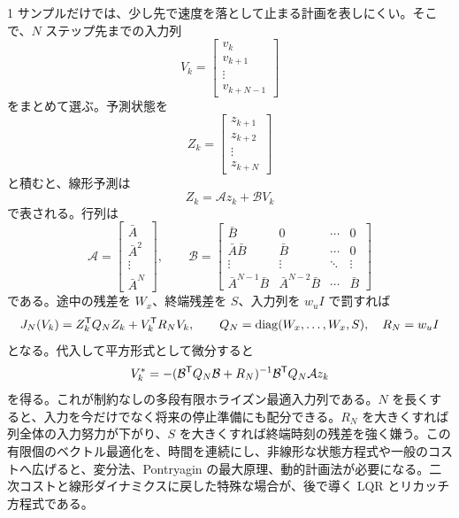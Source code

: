 1 サンプルだけでは、少し先で速度を落として止まる計画を表しにくい。そこで、$N$ ステップ先までの入力列
\begin{equation}
  V_k=
  \begin{bmatrix}
    v_k\\
    v_{k+1}\\
    \vdots\\
    v_{k+N-1}
  \end{bmatrix}
\end{equation}
をまとめて選ぶ。予測状態を
\begin{equation}
  Z_k=
  \begin{bmatrix}
    z_{k+1}\\
    z_{k+2}\\
    \vdots\\
    z_{k+N}
  \end{bmatrix}
\end{equation}
と積むと、線形予測は
\begin{equation}
  Z_k=\mathcal{A}z_k+\mathcal{B}V_k
  \label{eq:stacked-prediction}
\end{equation}
で表される。行列は
\begin{equation}
  \mathcal{A}=
  \begin{bmatrix}
    \bar{A}\\
    \bar{A}^2\\
    \vdots\\
    \bar{A}^N
  \end{bmatrix},
  \qquad
  \mathcal{B}=
  \begin{bmatrix}
    \bar{B} & 0 & \cdots & 0\\
    \bar{A}\bar{B} & \bar{B} & \cdots & 0\\
    \vdots & \vdots & \ddots & \vdots\\
    \bar{A}^{N-1}\bar{B} & \bar{A}^{N-2}\bar{B} & \cdots & \bar{B}
  \end{bmatrix}
\end{equation}
である。途中の残差を $W_x$、終端残差を $S$、入力列を $w_u I$ で罰すれば
\begin{equation}
  J_N(V_k)
  =
  Z_k^{\mathsf{T}} Q_N Z_k+V_k^{\mathsf{T}} R_N V_k,
  \qquad
  Q_N=\operatorname{diag}(W_x,\ldots,W_x,S),
  \quad
  R_N=w_u I
\end{equation}
となる。代入して平方形式として微分すると
\begin{equation}
  V_k^*
  =
  -(\mathcal{B}^{\mathsf{T}} Q_N\mathcal{B}+R_N)^{-1}
  \mathcal{B}^{\mathsf{T}} Q_N\mathcal{A}z_k
  \label{eq:stacked-finite-horizon-solution}
\end{equation}
を得る。これが制約なしの多段有限ホライズン最適入力列である。$N$ を長くすると、入力を今だけでなく将来の停止準備にも配分できる。$R_N$ を大きくすれば列全体の入力努力が下がり、$S$ を大きくすれば終端時刻の残差を強く嫌う。この有限個のベクトル最適化を、時間を連続にし、非線形な状態方程式や一般のコストへ広げると、変分法、Pontryagin の最大原理、動的計画法が必要になる。二次コストと線形ダイナミクスに戻した特殊な場合が、後で導く LQR とリカッチ方程式である。

